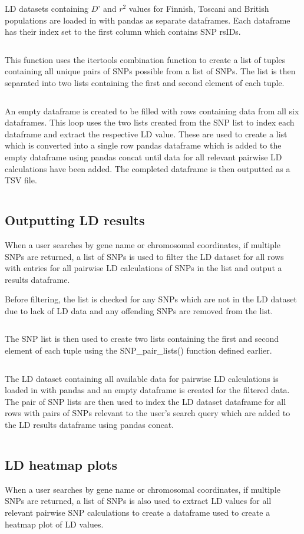 \documentclass[12pt,a4paper]{article}
\newcommand{\mintfile}[1]{
\begin{tcolorbox}[colback=gray!5!white,%
	grow to left by=20mm,
    grow to right by=20mm,
    sharp corners]{{    \small \inputminted[breaklines]{python}{#1}		}}
\end{tcolorbox}}
\newcommand{\subsect}[1]{
\FloatBarrier %
\hypertarget{#1}{
\subsection{#1}\label{#1}}
}
\begin{document}
LD datasets containing $D’$ and $r^2$  values for Finnish, Toscani and British populations are loaded in with pandas as separate dataframes. Each dataframe has their index set to the first column which contains SNP rsIDs.
\mintfile{code_snippets/placeholder.py}

This function uses the itertools combination function to create a list of tuples containing all unique pairs of SNPs possible from a list of SNPs. The list is then separated into two lists containing the first and second element of each tuple.
\mintfile{code_snippets/placeholder.py}

An empty dataframe is created to be filled with rows containing data from all six dataframes. This loop uses the two lists created from the SNP list to index each dataframe and extract the respective LD value. These are used to create a list which is converted into a single row pandas dataframe which is added to the empty dataframe using pandas concat until data for all relevant pairwise LD calculations have been added. The completed dataframe is then outputted as a TSV file.
\mintfile{code_snippets/placeholder.py}


\subsect{Outputting LD results}
When a user searches by gene name or chromosomal coordinates, if multiple SNPs are returned, a list of SNPs is used to filter the LD dataset for all rows with entries for all pairwise LD calculations of SNPs in the list and output a results dataframe.


Before filtering, the list is checked for any SNPs which are not in the LD dataset due to lack of LD data and any offending SNPs are removed from the list.
\mintfile{code_snippets/placeholder.py}

The SNP list is then used to create two lists containing the first and second element of each tuple using the SNP\_pair\_lists() function defined earlier.
\mintfile{code_snippets/placeholder.py}


The LD dataset containing all available data for pairwise LD calculations is loaded in with pandas and an empty dataframe is created for the filtered data. The pair of SNP lists are then used to index the LD dataset dataframe for all rows with pairs of SNPs relevant to the user’s search query which are added to the LD results dataframe using pandas concat.
\mintfile{code_snippets/placeholder.py}

\subsect{LD heatmap plots}

When a user searches by gene name or chromosomal coordinates, if multiple SNPs are returned, a list of SNPs is also used to extract LD values for all relevant pairwise SNP calculations to create a dataframe used to create a heatmap plot of LD values.
\end{document}
